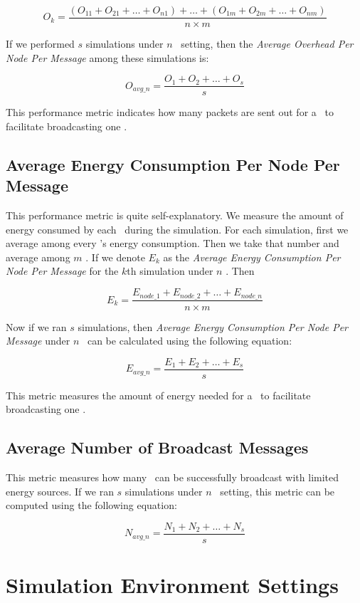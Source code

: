 \[ O_{k} = \frac{(O_{11} + O_{21} + \ldots + O_{n1})  + \ldots + (O_{1m} + O_{2m} + \ldots + O_{nm})}{n\times m} \]

If we performed $s$ simulations under $n$ \gns ~setting, then the \emph{Average Overhead Per Node Per Message} among these simulations is:

\[ O_{avg\_n} = \frac{O_1 + O_2 + \ldots + O_s}{s} \]


This performance metric indicates how many packets are sent out for a \gn ~to facilitate broadcasting one \msg. 

\subsection{Average Energy Consumption Per Node Per Message}

This performance metric is quite self-explanatory. We measure the amount of energy consumed by each \gn ~during the simulation. For each simulation, first we average among every \gn's energy consumption. Then we take that number and average among $m$ \msgs. If we denote $E_k$ as the \emph{Average Energy Consumption Per Node Per Message} for the $k$th simulation under $n$ \gns. Then 

\[ E_k = \frac{E_{node\_1} + E_{node\_2} + \ldots + E_{node\_n}}{n\times m} \]

Now if we ran $s$ simulations, then \emph{Average Energy Consumption Per Node Per Message} under $n$ \gns ~can be calculated using the following equation:

\[ E_{avg\_n} = \frac{E_1 + E_2 + \ldots + E_s}{s} \]

This metric measures the amount of energy needed for a \gn ~to facilitate broadcasting one \msg. 

\subsection{Average Number of Broadcast Messages}

This metric measures how many \msgs ~can be successfully broadcast with limited energy sources. If we ran $s$ simulations under $n$ \gns ~setting, this metric can be computed using the following equation:

\[ N_{avg\_n} = \frac{N_1 + N_2 + \dots + N_s}{s} \]

\section{Simulation Environment Settings}

